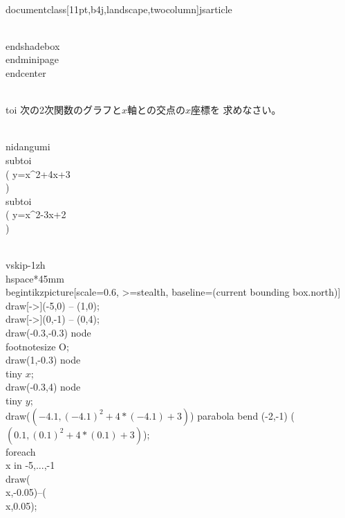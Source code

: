 \\documentclass[11pt,b4j,landscape,twocolumn]{jsarticle}
\begin{document}
\\end{shadebox}
\\end{minipage}
\\end{center}



\\toi 次の2次関数のグラフと$x$軸との交点の$x$座標を
求めなさい。

\\nidangumi{\\subtoi \\( y=x^2+4x+3 \\) }
			{\\subtoi  \\(  y=x^2-3x+2 \\) }

\\vskip-1zh
\\hspace*{45mm}
\\begin{tikzpicture}[scale=0.6, >=stealth, baseline=(current bounding box.north)]
\\draw[->](-5,0) -- (1,0);
\\draw[->](0,-1) -- (0,4);
\\draw(-0.3,-0.3) node {\\footnotesize O};
\\draw(1,-0.3) node {\\tiny $x$};
\\draw(-0.3,4) node {\\tiny $y$};
\\draw($ (-4.1,{(-4.1)^2+4*(-4.1)+3}) $) parabola bend (-2,-1) ($ (0.1,{(0.1)^2+4*(0.1)+3}) $);
\\foreach \\x in {-5,...,-1}{\\draw(\\x,-0.05)--(\\x,0.05);}
\end{document}
